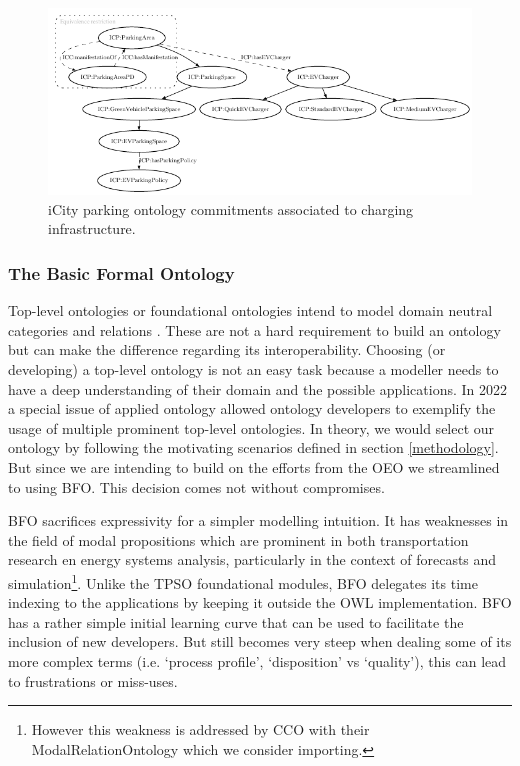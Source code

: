 \begin{figure}[h]
    \centering
    \includegraphics[width=1.0\textwidth]{images/PARKING}
    \caption{iCity parking ontology commitments associated to charging infrastructure.}
    \label{parkingfig}
\end{figure}

\subsubsection{The Basic Formal Ontology}
\label{upperlevel}

Top-level ontologies or foundational ontologies intend to model domain neutral
categories and relations \cite{Arp.2015}. These are not a hard requirement to
build an ontology but can make the difference regarding its interoperability.
Choosing (or developing) a top-level ontology is not an easy task because a
modeller needs to have a deep understanding of their domain and the possible
applications. In 2022 a special issue of applied ontology \cite{Borgo.2022}
allowed ontology developers to exemplify the usage of multiple prominent
top-level ontologies. In theory, we would select our ontology by following the
motivating scenarios defined in section \ref{methodology}. But since we are
intending to build on the efforts from the OEO we streamlined to using BFO.
This decision comes not without compromises. 

BFO sacrifices expressivity for a simpler modelling intuition. It has
weaknesses in the field of modal propositions which are prominent in both
transportation research en energy systems analysis, particularly in the context
of forecasts and simulation\footnote{However this weakness is addressed by CCO
with their ModalRelationOntology which we consider importing. }. Unlike the
TPSO foundational modules, BFO delegates its time indexing to the applications
by keeping it outside the OWL implementation. BFO has a rather simple initial
learning curve that can be used to facilitate the inclusion of new developers.
But still becomes very steep when dealing some of its more complex terms (i.e.
`process profile', `disposition' vs `quality'), this can lead to frustrations
or miss-uses.

